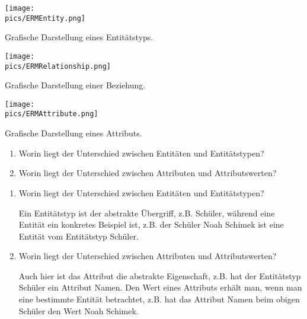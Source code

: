 \begin{minipage}{\textwidth}
	\begin{minipage}{0.33\textwidth}
		\centering\texttt{[image: \\pics/ERMEntity.png]}

		Grafische Darstellung eines Entitätstyps.
	\end{minipage}
	\begin{minipage}{0.33\textwidth}
		\centering\texttt{[image: \\pics/ERMRelationship.png]}

		Grafische Darstellung einer Beziehung.
	\end{minipage}
	\begin{minipage}{0.33\textwidth}
		\centering\texttt{[image: \\pics/ERMAttribute.png]}

		Grafische Darstellung eines Attributs.
	\end{minipage}
\end{minipage}
\begin{Exercise}[title={Beantworte folgende Fragen.}, label=ERMFragen1]
	\begin{enumerate}
		\item Worin liegt der Unterschied zwischen Entitäten und Entitätstypen?
		\item Worin liegt der Unterschied zwischen Attributen und Attributswerten?
	\end{enumerate}
\end{Exercise}
\begin{Answer}[ref=ERMFragen1]
	\begin{enumerate}
		\item Worin liegt der Unterschied zwischen Entitäten und Entitätstypen?

		Ein Entitätstyp ist der abstrakte Übergriff, z.B. Schüler, während eine Entität ein konkretes Beispiel ist, z.B. der Schüler Noah Schimek ist eine Entität vom Entitätstyp Schüler.
		\item Worin liegt der Unterschied zwischen Attributen und Attributswerten?

		Auch hier ist das Attribut die abstrakte Eigenschaft, z.B. hat der Entitätstyp Schüler ein Attribut Namen. Den Wert eines Attributs erhält man, wenn man eine bestimmte Entität betrachtet, z.B. hat das Attribut Namen beim obigen Schüler den Wert Noah Schimek.
	\end{enumerate}
\end{Answer}
